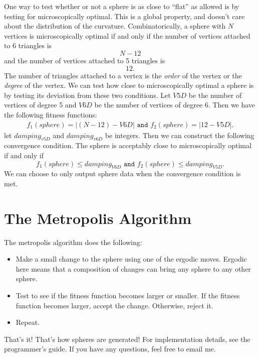 \documentclass{article}
\begin{document}
One way to test whether or not a sphere is as close to ``flat'' as
allowed is by testing for microscopically optimal. This is a global
property, and doesn't care about the distribution of the
curvature. Combinatorically, a sphere with $N$ vertices is
microscopically optimal if and only if the number of vertices attached
to 6 triangles is
$$N - 12$$
and the number of vertices attached to 5 triangles is 
$$12.$$
The number of triangles attached to a vertex is the \textit{order} of
the vertex or the \textit{degree} of the vertex. We can test how close
to microscopically optimal a sphere is by testing its deviation from
these two conditions. Let $V5D$ be the number of vertices of degree 5
and $V6D$ be the number of vertices of degree 6. Then we have the
following fitness functions:
\begin{eqnarray}
  f_1(sphere) = |(N-12) - V6D|\texttt{ and }f_2(sphere) = |12 - V5D|.\nonumber
\end{eqnarray}
let $damping_{v5D}$ and $damping_{v6D}$ be integers. Then we can
construct the following convergence condition. The sphere is
acceptably close to microscopically optimal if and only if
$$f_1(sphere) \leq damping_{V6D}\texttt{ and }f_2(sphere)\leq damping_{V5D}.$$
We can choose to only output sphere data when the convergence
condition is met. 

\section{The Metropolis Algorithm}
The metropolis algorithm does the following:
\begin{itemize}
\item Make a small change to the sphere using one of the ergodic
  moves. Ergodic here means that a composition of changes can bring
  any sphere to any other sphere.
\item Test to see if the fitness function becomes larger or
  smaller. If the fitness function becomes larger, accept the
  change. Otherwise, reject it.
\item Repeat.
\end{itemize}

That's it! That's how spheres are generated! For implementation
details, see the programmer's guide. If you have any questions, feel
free to email me.
\end{document}
